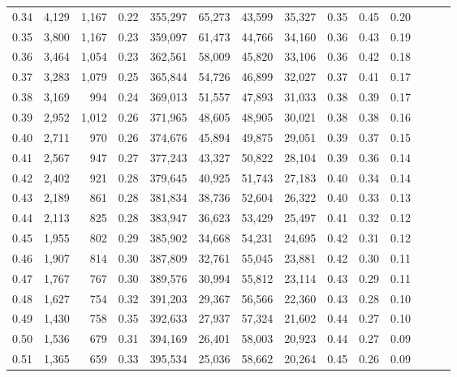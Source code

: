 \begin{tabular}{rrrrrrrrrrrrrr}
0.34 &   4,129 &  1,167 &  0.22 &  355,297 &   65,273 &  43,599 &  35,327 &  0.35 &  0.45 &      0.20 \\
0.35 &   3,800 &  1,167 &  0.23 &  359,097 &   61,473 &  44,766 &  34,160 &  0.36 &  0.43 &      0.19 \\
0.36 &   3,464 &  1,054 &  0.23 &  362,561 &   58,009 &  45,820 &  33,106 &  0.36 &  0.42 &      0.18 \\
0.37 &   3,283 &  1,079 &  0.25 &  365,844 &   54,726 &  46,899 &  32,027 &  0.37 &  0.41 &      0.17 \\
0.38 &   3,169 &    994 &  0.24 &  369,013 &   51,557 &  47,893 &  31,033 &  0.38 &  0.39 &      0.17 \\
0.39 &   2,952 &  1,012 &  0.26 &  371,965 &   48,605 &  48,905 &  30,021 &  0.38 &  0.38 &      0.16 \\
0.40 &   2,711 &    970 &  0.26 &  374,676 &   45,894 &  49,875 &  29,051 &  0.39 &  0.37 &      0.15 \\
0.41 &   2,567 &    947 &  0.27 &  377,243 &   43,327 &  50,822 &  28,104 &  0.39 &  0.36 &      0.14 \\
0.42 &   2,402 &    921 &  0.28 &  379,645 &   40,925 &  51,743 &  27,183 &  0.40 &  0.34 &      0.14 \\
0.43 &   2,189 &    861 &  0.28 &  381,834 &   38,736 &  52,604 &  26,322 &  0.40 &  0.33 &      0.13 \\
0.44 &   2,113 &    825 &  0.28 &  383,947 &   36,623 &  53,429 &  25,497 &  0.41 &  0.32 &      0.12 \\
0.45 &   1,955 &    802 &  0.29 &  385,902 &   34,668 &  54,231 &  24,695 &  0.42 &  0.31 &      0.12 \\
0.46 &   1,907 &    814 &  0.30 &  387,809 &   32,761 &  55,045 &  23,881 &  0.42 &  0.30 &      0.11 \\
0.47 &   1,767 &    767 &  0.30 &  389,576 &   30,994 &  55,812 &  23,114 &  0.43 &  0.29 &      0.11 \\
0.48 &   1,627 &    754 &  0.32 &  391,203 &   29,367 &  56,566 &  22,360 &  0.43 &  0.28 &      0.10 \\
0.49 &   1,430 &    758 &  0.35 &  392,633 &   27,937 &  57,324 &  21,602 &  0.44 &  0.27 &      0.10 \\
0.50 &   1,536 &    679 &  0.31 &  394,169 &   26,401 &  58,003 &  20,923 &  0.44 &  0.27 &      0.09 \\
0.51 &   1,365 &    659 &  0.33 &  395,534 &   25,036 &  58,662 &  20,264 &  0.45 &  0.26 &      0.09 \\

\end{tabular}
